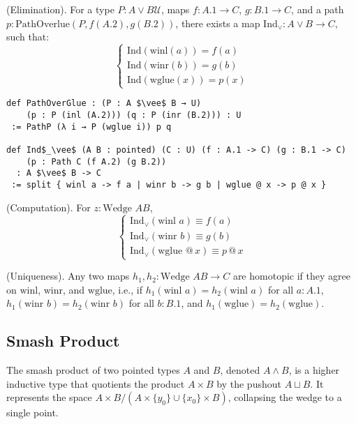 \documentclass{article}
\begin{document}
\begin{theorem} (Elimination).
For a type \( P : A \vee B \mathcal{U} \), maps \( f : A.1 \to C \),
\( g : B.1 \to C \), and a path \( p : \text{PathOverlue}(P,f(A.2),g (B.2)) \),
there exists a map \( \text{Ind}_\vee : A \vee B \to C \), such that:
\[
\begin{cases}
\text{Ind}(\text{winl}(a)) = f(a) \\
\text{Ind}(\text{winr}(b)) = g(b) \\
\text{Ind}(\text{wglue}(x)) = p(x)
\end{cases}
\]
\begin{lstlisting}[mathescape=true]
def PathOverGlue : (P : A $\vee$ B → U)
    (p : P (inl (A.2))) (q : P (inr (B.2))) : U
 := PathP (λ i → P (wglue i)) p q

def Ind$_\vee$ (A B : pointed) (C : U) (f : A.1 -> C) (g : B.1 -> C)
    (p : Path C (f A.2) (g B.2))
  : A $\vee$ B -> C
 := split { winl a -> f a | winr b -> g b | wglue @ x -> p @ x }
\end{lstlisting}
\end{theorem}

\begin{theorem} (Computation).
For \( z : \text{Wedge } A B \),
\[
\begin{cases}
\text{Ind}_\vee(\text{winl } a) \equiv f(a) \\
\text{Ind}_\vee(\text{winr } b) \equiv g(b) \\
\text{Ind}_\vee(\text{wglue } @ \, x) \equiv p \, @ \, x
\end{cases}
\]
\end{theorem}

\begin{theorem} (Uniqueness).
Any two maps \( h_1, h_2 : \text{Wedge } A B \to C \) are homotopic if
they agree on \( \text{winl} \), \( \text{winr} \), and \( \text{wglue} \),
i.e., if \( h_1(\text{winl } a) = h_2(\text{winl } a) \) for
all \( a : A.1 \), \( h_1(\text{winr } b) = h_2(\text{winr } b) \) for
all \( b : B.1 \), and \( h_1(\text{wglue}) = h_2(\text{wglue}) \).
\end{theorem}

\newpage
\subsection{Smash Product}
The smash product of two pointed types \( A \) and \( B \), denoted \( A \wedge B \),
is a higher inductive type that quotients the product \( A \times B \) by
the pushout \( A \sqcup B \). It represents the space \( A \times B / (A \times \{ y_0 \} \cup \{ x_0 \} \times B) \),
collapsing the wedge to a single point.
\end{document}
